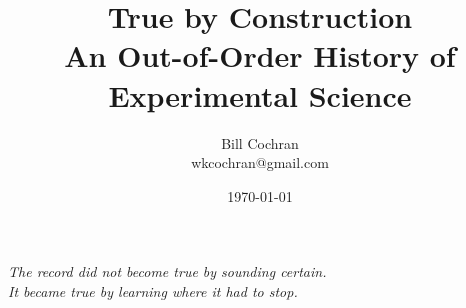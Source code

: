 \documentclass[12pt,oneside]{book}
\begin{document}
\title{True by Construction\\
\large An Out-of-Order History of Experimental Science}

\author{Bill Cochran\\wkcochran@gmail.com}
\date{\today}

\maketitle

\begin{center}
\vspace*{2em}
\textit{The record did not become true by sounding certain.\\
It became true by learning where it had to stop.}
\vspace*{6em}
\end{center}

\newpage
\frontmatter
\onehalfspacing


\tableofcontents


\mainmatter






\cleardoublepage

\backmatter




\end{document}

